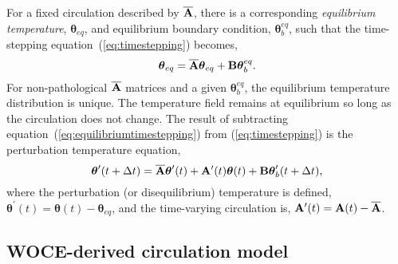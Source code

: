 \documentclass[12pt]{article}
\begin{document}
For a fixed circulation described by ${\overline {\bf A}}$, there is a
corresponding {\it equilibrium temperature},
${\boldsymbol \theta}_{eq}$, and equilibrium boundary condition,
${\boldsymbol \theta}^{eq}_{b}$, such that the time-stepping
equation~(\ref{eq:timestepping}) becomes,
\begin{equation}
\label{eq:equilibriumtimestepping}
{\boldsymbol \theta}_{eq} = {\overline {\bf A}} {\boldsymbol \theta}_{eq} + {\bf B} {\boldsymbol \theta}^{eq}_{b}. 
\end{equation}
For non-pathological ${\overline {\bf A}}$ matrices and a given ${\boldsymbol \theta}^{eq}_{b}$, the equilibrium temperature distribution is unique.
The temperature field remains at equilibrium so long as the circulation does not change. The result of subtracting equation~(\ref{eq:equilibriumtimestepping}) from (\ref{eq:timestepping}) is the perturbation temperature equation,
\begin{equation}
\label{eq:perturbationtemperature}
{\boldsymbol \theta}^\prime(t+ \Delta t) = {\overline {\bf A}} {\boldsymbol \theta}^\prime(t) +  {\bf A}^\prime(t){\boldsymbol \theta(t)} + {\bf B} {\boldsymbol  \theta}^\prime_{b}(t+\Delta t), 
\end{equation}
where the perturbation (or disequilibrium) temperature is defined,
${\boldsymbol \theta}^\prime(t) = {\boldsymbol \theta}(t) - {\boldsymbol \theta}_{eq}$,
and the time-varying circulation is,
${\bf A}^\prime(t) = {\bf A}(t) - {\overline {\bf A}}$.

\subsection{WOCE-derived circulation model}
\end{document}
